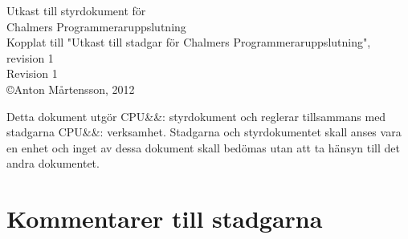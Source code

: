 \documentclass[a4paper]{article}
\newcommand\CPU[1][]{CPU\ifx&#1&\else:#1\fi\xspace}
\begin{document}
\begin{center}
	{\Huge Utkast till styrdokument för} \\[0.5em]
	{\Huge Chalmers Programmeraruppslutning} \\[1em]
	{Kopplat till "Utkast till stadgar för Chalmers Programmeraruppslutning", revision 1} \\[1em]
	{Revision 1} \\
	{\copyright Anton Mårtensson, 2012}
\end{center}

Detta dokument utgör \CPU{s} styrdokument och reglerar tillsammans med stadgarna \CPU{s} verksamhet. Stadgarna och styrdokumentet skall anses vara en enhet och inget av dessa dokument skall bedömas utan att ta hänsyn till det andra dokumentet.

\section*{Kommentarer till stadgarna}
\def\commentheader#1{\textbf{#1}\\}


\end{document}
